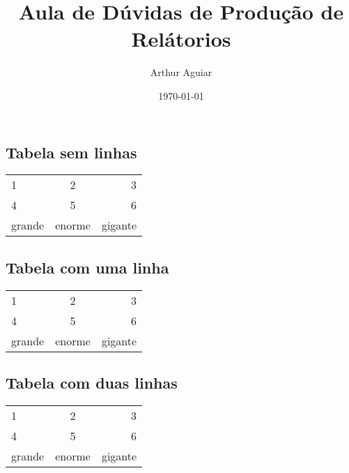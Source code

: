 \documentclass[a4paper, 11pt]{report}
\title{Aula de Dúvidas de Produção de Relátorios}
\author{Arthur Aguiar}
\date{\today}
\begin{document}
\maketitle

\chapter{}

\section{Tabela sem linhas}

\begin{table}[h!]
	\centering
	\begin{tabular}{l c r}
		1      & 2        & 3      \\
		4      & 5        & 6      \\
		grande & enorme   & gigante \\
	\end{tabular}
\end{table}

\section{Tabela com uma linha}

\begin{table}[h!]
	\centering
	\begin{tabular}{ l | c r }
		1      & 2        & 3      \\
		4      & 5        & 6      \\
		grande & enorme   & gigante \\
	\end{tabular}
\end{table}


\section{Tabela com duas linhas}

\begin{table}[h!]
	\centering
	\begin{tabular}{ l | c | r}
		1      & 2        & 3      \\
		4      & 5        & 6      \\
		grande & enorme   & gigante \\
	\end{tabular}
\end{table}
\end{document}
